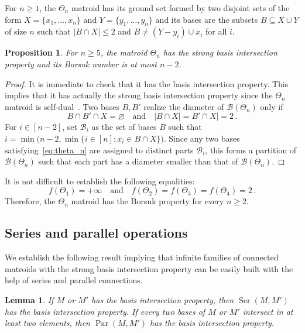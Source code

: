\documentclass[12pt]{amsart}
\theoremstyle{plain}
\newtheorem{lemma}[theorem]{Lemma}
\newtheorem{proposition}[theorem]{Proposition}
\theoremstyle{definition}
\theoremstyle{remark}
\renewcommand{\leq}{\leqslant}
\renewcommand{\geq}{\geqslant}
\newcommand{\Ser}{\operatorname{Ser}}
\newcommand{\Par}{\operatorname{Par}}
\def \B {\mathcal{B}}
\begin{document}
For $n\geq 1$, the $\Theta_n$ matroid has its ground set formed by two disjoint sets of the form $X=\{x_1,\ldots ,x_n\}$ and $Y=\{y_1,\ldots ,  y_n\}$ and its bases are the subsets $B \subseteq X \cup Y$ of size $n$ such that $|B \cap X | \leq 2$ and $B \neq (Y - y_i) \cup x_i$ for all $i$.

\begin{proposition}\label{prop:theta_n}
For $n\geq 5$, the matroid $\Theta_n$ has the strong basis intersection property and its Borsuk number is at most $n-2$.
\end{proposition}

\begin{proof}
It is immediate to check that it has the basis intersection property. This implies that it has actually the strong basis intersection property since the $\Theta_n$ matroid is self-dual~\cite[p.~663]{oxley2011matroid}. Two bases $B,B'$ realize the diameter of $\B(\Theta_n)$ only if 
\begin{equation}\label{eq:theta_n}
B\cap B'\cap X = \varnothing \quad \mbox{and} \quad |B \cap X| = B' \cap X| = 2 \, .
\end{equation} For $i \in [n-2]$, set $\B_i$ as the set of bases $B$ such that $i=\min\bigl(n-2,\min\{i \in [n] \colon x_i \in B\cap X\}\bigr)$. Since any two bases satisfying~\eqref{eq:theta_n} are assigned to distinct parts $\B_i$, this forms a partition of $\B(\Theta_n)$ such that each part has a diameter smaller than that of $\B(\Theta_n)$.
\end{proof}

It is not difficult to establish the following equalities:
\[
f(\Theta_1) = +\infty \quad \mbox{and} \quad f(\Theta_2) = f(\Theta_3) = f(\Theta_4) = 2\, .
\]
Therefore, the $\Theta_n$ matroid has the Borsuk property for every $n\geq 2$.

\subsection{Series and parallel operations}\label{subsec:ser-par}
We establish the following result implying that infinite families of connected matroids with the strong basis intersection property can be easily built with the help of series and parallel connections.

\begin{lemma}\label{lem:connec}
If $M$ or $M'$ has the basis intersection property, then $\Ser(M,M')$ has the basis intersection property. If every two bases of $M$ or $M'$ intersect in at least two elements, then $\Par(M,M')$ has the basis intersection property.
\end{lemma}
\end{document}
